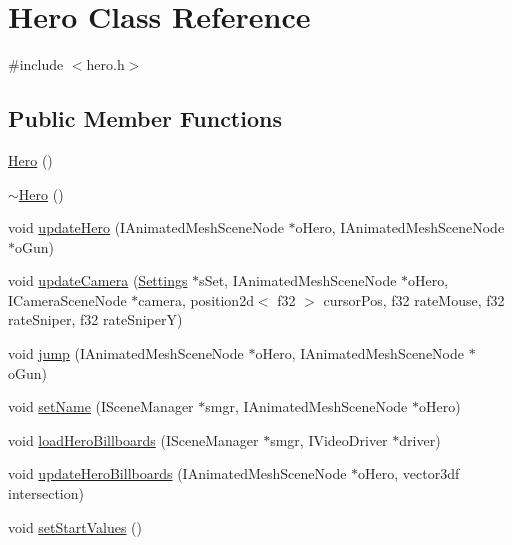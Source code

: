 \hypertarget{class_hero}{
\section{Hero Class Reference}
\label{class_hero}
}


{\ttfamily \#include $<$hero.h$>$}\subsection*{Public Member Functions}
\begin{DoxyCompactItemize}
\item 
\hyperlink{class_hero_ab5920677a4b5cb59d6f513922d037dca}{Hero} ()
\item 
\hyperlink{class_hero_a5aeef41ede5a80dc29c5acd7b553c4da}{$\sim$Hero} ()
\item 
void \hyperlink{class_hero_ad57516db78b85e46ff6f063c6247a05c}{updateHero} (IAnimatedMeshSceneNode $\ast$oHero, IAnimatedMeshSceneNode $\ast$oGun)
\item 
void \hyperlink{class_hero_abbbe33967d88b417ea31f86ab68d9499}{updateCamera} (\hyperlink{struct_settings}{Settings} $\ast$sSet, IAnimatedMeshSceneNode $\ast$oHero, ICameraSceneNode $\ast$camera, position2d$<$ f32 $>$ cursorPos, f32 rateMouse, f32 rateSniper, f32 rateSniperY)
\item 
void \hyperlink{class_hero_a46f8101e8f28057d8cc048cf9496db35}{jump} (IAnimatedMeshSceneNode $\ast$oHero, IAnimatedMeshSceneNode $\ast$oGun)
\item 
void \hyperlink{class_hero_a27173f26480105b6acbf3ab740c9b82b}{setName} (ISceneManager $\ast$smgr, IAnimatedMeshSceneNode $\ast$oHero)
\item 
void \hyperlink{class_hero_a7682852f066beb607b1cf96894c40201}{loadHeroBillboards} (ISceneManager $\ast$smgr, IVideoDriver $\ast$driver)
\item 
void \hyperlink{class_hero_a31dd095888381f04a7ea22af8a8e40df}{updateHeroBillboards} (IAnimatedMeshSceneNode $\ast$oHero, vector3df intersection)
\item 
void \hyperlink{class_hero_ab87e6847fb025a4be4b6d33ed429f7d0}{setStartValues} ()
\end{DoxyCompactItemize}
